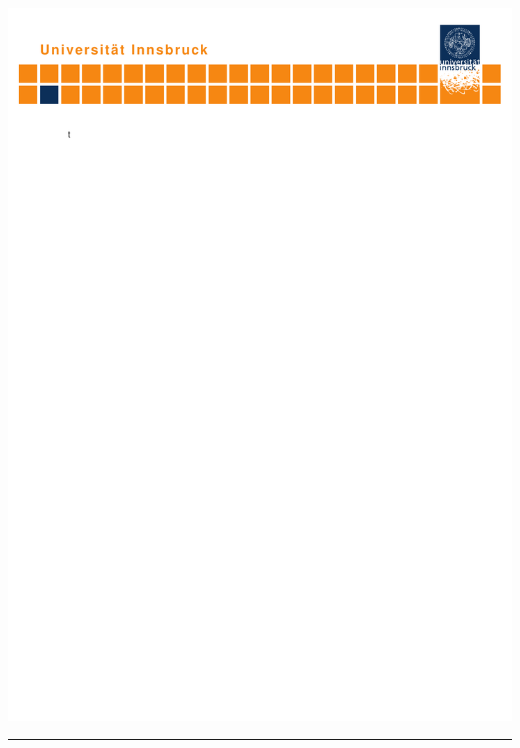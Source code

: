 \documentclass[a4paper,11pt,listof=nochaptergap,oneside,pointednumbers,bibtotoc,bigheadings,liststotoc,hidelinks]{scrbook}
\theoremstyle{mysatz}
\theoremstyle{mydefinition}
\theoremstyle{mytheorem}
\theoremstyle{mybemerkung}
\begin{document}
\begin{titlepage}
    \begin{center}
        \hspace*{-0.27\textwidth}\includegraphics[width=1.419\textwidth, trim = 5mm 250mm 0mm 0mm, clip = TRUE]{logo.pdf}\hspace*{-0.3\textwidth}
        \quad \\[0mm]
        \newcommand{\HRule}{\rule{\linewidth}{0.3mm}} %
        \HRule \\[-1mm]

\end{center}
\end{titlepage}
\end{document}
